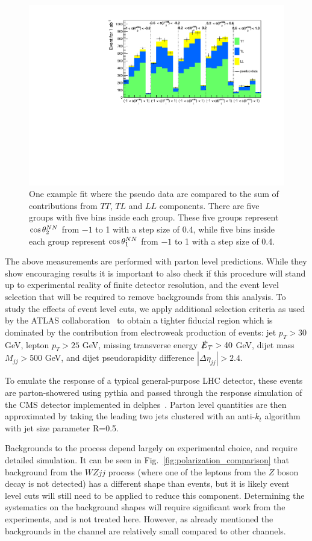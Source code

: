 \begin{figure}[h]
\includegraphics[width=.49\textwidth]{./fig/NN_fit_3.pdf}
\caption{\label{fig:fit_example} One example fit where the pseudo data are compared to the sum of 
contributions from $TT$, $TL$ and $LL$ components. There are five groups with five bins inside each group. 
These five groups represent $ \cos \theta^{NN}  _2$ from $-1$ to 1 with a step size of 0.4, while five bins inside each group represent $ \cos \theta^{NN}  _1$ from $-1$ to 1 with a step size of 0.4. }
\end{figure}

The above measurements are performed with parton level predictions. While they show encouraging results  it is important 
to also check if this procedure will stand up to experimental reality of finite detector resolution, and the event level selection that
will be required to remove backgrounds from this analysis. To study the effects of event level cuts, we apply additional selection criteria as used by the ATLAS collaboration~\cite{ATLAS_ssWW} to obtain a
tighter fiducial region which is dominated by the contribution from electroweak production of \ssWW events: jet $p_T > 30$ GeV, lepton $p_T > 25$ GeV, missing transverse energy $\slashed{E}_T > 40$ GeV, 
dijet mass $M_{jj} > $500 GeV, and dijet pseudorapidity difference $|\Delta \eta_{jj}| > 2.4 $. 

To emulate the response of a typical general-purpose LHC detector, these events are parton-showered using {\sc pythia}\cite{pythia} and passed through the  response simulation of the CMS detector implemented in {\sc delphes}~\cite{delphes}. Parton level quantities are then approximated by taking the leading two jets clustered with an anti-$k_t$ algorithm~\cite{antikt} with jet size parameter R=0.5.

Backgrounds to the \ssWW process depend largely on experimental choice, and require detailed simulation. It can be seen in Fig.~\ref{fig:polarization_comparison} that background from the $WZjj$ process (where one of 
the leptons from the $Z$ boson decay is not detected) has a different \ctsNN shape than \ssWW events, but it is likely event level cuts will still need to be applied to reduce this component. Determining the systematics on the background shapes will require significant work from the experiments, and is not treated here. However, as already mentioned the backgrounds in the \ssWW channel are relatively small compared to other channels.

